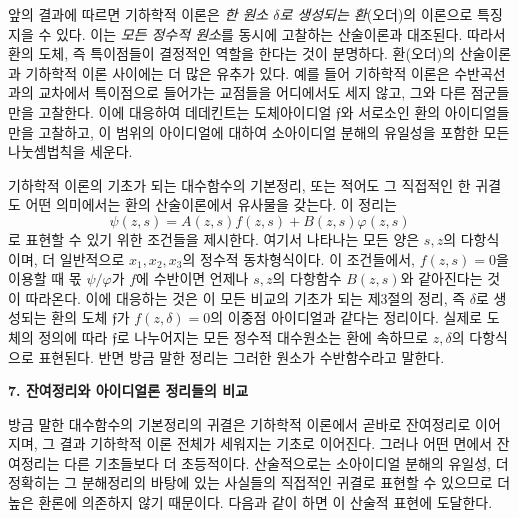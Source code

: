 앞의 결과에 따르면 기하학적 이론은 \emph{한 원소 \(\delta\)로 생성되는 환}(오더)의 이론으로 특징지을 수 있다. 이는 \emph{모든 정수적 원소}를 동시에 고찰하는 산술이론과 대조된다. 따라서 환의 도체, 즉 특이점들이 결정적인 역할을 한다는 것이 분명하다. 환(오더)의 산술이론과 기하학적 이론 사이에는 더 많은 유추가 있다. 예를 들어 기하학적 이론은 수반곡선과의 교차에서 특이점으로 들어가는 교점들을 어디에서도 세지 않고, 그와 다른 점군들만을 고찰한다. 이에 대응하여 데데킨트는 도체아이디얼 \(\mathfrak f\)와 서로소인 환의 아이디얼들만을 고찰하고, 이 범위의 아이디얼에 대하여 소아이디얼 분해의 유일성을 포함한 모든 나눗셈법칙을 세운다.

기하학적 이론의 기초가 되는 \glqq{}대수함수의 기본정리\grqq{}, 또는 적어도 그 직접적인 한 귀결도 어떤 의미에서는 환의 산술이론에서 유사물을 갖는다. 이 정리는
\[
\psi(z,s)=A(z,s)f(z,s)+B(z,s)\varphi(z,s)
\]
로 표현할 수 있기 위한 조건들을 제시한다. 여기서 나타나는 모든 양은 \(s,z\)의 다항식이며, 더 일반적으로 \(x_1,x_2,x_3\)의 정수적 동차형식이다. 이 조건들에서, \(f(z,s)=0\)을 이용할 때 몫 \(\psi/\varphi\)가 \(f\)에 수반이면 언제나 \(s,z\)의 다항함수 \(B(z,s)\)와 같아진다는 것이 따라온다. 이에 대응하는 것은 이 모든 비교의 기초가 되는 제3절의 정리, 즉 \(\delta\)로 생성되는 환의 도체 \(\mathfrak f\)가 \(f(z,\delta)=0\)의 이중점 아이디얼과 같다는 정리이다. 실제로 도체의 정의에 따라 \(\mathfrak f\)로 나누어지는 모든 정수적 대수원소는 환에 속하므로 \(z,\delta\)의 다항식으로 표현된다. 반면 방금 말한 정리는 그러한 원소가 수반함수라고 말한다.

\begin{center}
\textbf{7. 잔여정리와 아이디얼론 정리들의 비교}
\end{center}

방금 말한 \glqq{}대수함수의 기본정리\grqq{}의 귀결은 기하학적 이론에서 곧바로 \glqq{}잔여정리\grqq{}로 이어지며, 그 결과 기하학적 이론 전체가 세워지는 기초로 이어진다. 그러나 어떤 면에서 잔여정리는 다른 기초들보다 더 초등적이다. 산술적으로는 소아이디얼 분해의 유일성, 더 정확히는 그 분해정리의 바탕에 있는 사실들의 직접적인 귀결로 표현할 수 있으므로 더 높은 환론에 의존하지 않기 때문이다. 다음과 같이 하면 이 산술적 표현에 도달한다.

